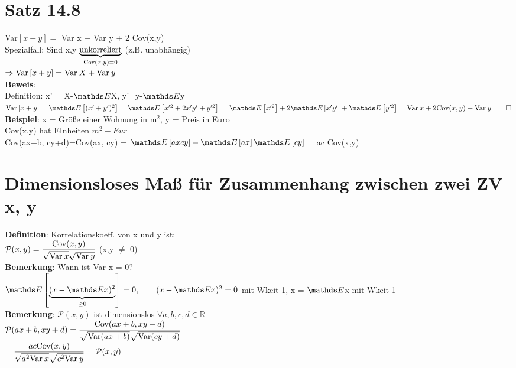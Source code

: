 \section{Satz 14.8}
Var$\left[x+y\right] =$ Var x + Var y + 2 Cov(x,y)\smallskip\\
Spezialfall: Sind x,y $\underbrace{\text{unkorreliert}}_{\text{Cov}(x,y) = 0}$ (z.B. unabhängig) \\$ \Rightarrow \text{Var}\left[x+y\right] = \text{Var}\: X + \text{Var}\:y $\medskip\\
\textbf{Beweis}:\\
Definition: x' = X-$\E$X, y'=y-$\E$y\medskip\\
$\var\left[x+y\right]=\E\left[(x'+y')^2\right]=\E\left[x'^2+2x'y'+y'^2\right]\smallskip\\
=\E\left[x'^2\right]+2\E\left[x'y'\right]+\E\left[y'^2\right] = \var\: x + 2 \cov(x,y)+\var\:y\qed$\medskip\\
\textbf{Beispiel}: x = Größe einer Wohnung in m$^2$, y = Preis in Euro\\
Cov(x,y) hat EInheiten $m^2-Eur$\smallskip\\
Cov(ax+b, cy+d)=Cov(ax, cy) = $\E\left[axcy\right]-\E\left[ax\right]\E\left[cy\right] = $ ac Cov(x,y)
\section{Dimensionsloses Maß für Zusammenhang zwischen zwei ZV x, y}
\textbf{Definition}: Korrelationskoeff. von x und y ist:\\
$\mathcal{P}(x,y) = \dfrac{\text{Cov} (x,y)}{\sqrt{\text{Var} \: x}\sqrt{\text{Var} \: y}}$ (x,y $\neq$ 0) \medskip\\
\textbf{Bemerkung}: Wann ist Var x = 0?\smallskip\\
$\E\left[\underbrace{(x-\E x)^2}_{\geq 0}\right] = 0, \qquad (x-\E x)^2=0$ mit Wkeit 1, x = $\E$x mit Wkeit 1\medskip\\
\textbf{Bemerkung}: $\mathcal{P}(x,y)$ ist dimensionslos $\forall a,b,c,d \in \mathds{R}$\smallskip\\
$\mathcal{P}(ax+b,xy+d) = \dfrac{\text{Cov}(ax+b,xy+d)}{\sqrt{\text{Var}(ax+b)}\sqrt{\text{Var}(cy+d)}}$\smallskip\\
$=\dfrac{ac\text{Cov}(x,y)}{\sqrt{a^2\text{Var}\: x}\sqrt{c^2\text{Var}\: y}}=\mathcal{P}(x,y)$
